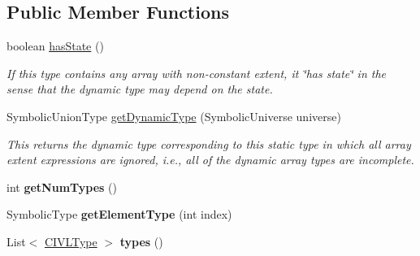 \subsection*{Public Member Functions}
\begin{DoxyCompactItemize}
\item 
boolean \hyperlink{classedu_1_1udel_1_1cis_1_1vsl_1_1civl_1_1model_1_1common_1_1type_1_1CommonBundleType_ae7adbf6b8e8c46eb21cc2705bd0a8ecb}{has\+State} ()
\begin{DoxyCompactList}\small\item\em If this type contains any array with non-\/constant extent, it \char`\"{}has state\char`\"{} in the sense that the dynamic type may depend on the state. \end{DoxyCompactList}\item 
Symbolic\+Union\+Type \hyperlink{classedu_1_1udel_1_1cis_1_1vsl_1_1civl_1_1model_1_1common_1_1type_1_1CommonBundleType_a3d7f5017555879ec72693b10775b822f}{get\+Dynamic\+Type} (Symbolic\+Universe universe)
\begin{DoxyCompactList}\small\item\em This returns the dynamic type corresponding to this static type in which all array extent expressions are ignored, i.\+e., all of the dynamic array types are incomplete. \end{DoxyCompactList}\item 
\hypertarget{classedu_1_1udel_1_1cis_1_1vsl_1_1civl_1_1model_1_1common_1_1type_1_1CommonBundleType_a60cead6f325e6265595a385d7d97922f}{}int {\bfseries get\+Num\+Types} ()\label{classedu_1_1udel_1_1cis_1_1vsl_1_1civl_1_1model_1_1common_1_1type_1_1CommonBundleType_a60cead6f325e6265595a385d7d97922f}

\item 
\hypertarget{classedu_1_1udel_1_1cis_1_1vsl_1_1civl_1_1model_1_1common_1_1type_1_1CommonBundleType_ab493eabf81e7932dedefb7b9b352c5e2}{}Symbolic\+Type {\bfseries get\+Element\+Type} (int index)\label{classedu_1_1udel_1_1cis_1_1vsl_1_1civl_1_1model_1_1common_1_1type_1_1CommonBundleType_ab493eabf81e7932dedefb7b9b352c5e2}

\item 
\hypertarget{classedu_1_1udel_1_1cis_1_1vsl_1_1civl_1_1model_1_1common_1_1type_1_1CommonBundleType_a143cca047148a29b64f520ce65f919f9}{}List$<$ \hyperlink{interfaceedu_1_1udel_1_1cis_1_1vsl_1_1civl_1_1model_1_1IF_1_1type_1_1CIVLType}{C\+I\+V\+L\+Type} $>$ {\bfseries types} ()\label{classedu_1_1udel_1_1cis_1_1vsl_1_1civl_1_1model_1_1common_1_1type_1_1CommonBundleType_a143cca047148a29b64f520ce65f919f9}


\end{DoxyCompactItemize}
